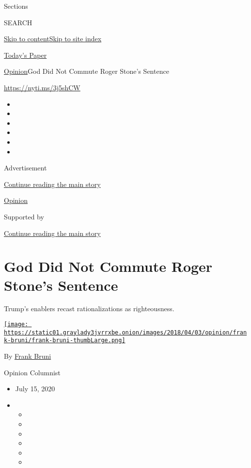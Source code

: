 Sections

SEARCH

\protect\hyperlink{site-content}{Skip to
content}\protect\hyperlink{site-index}{Skip to site index}

\href{https://myaccount.nytimes3xbfgragh.onion/auth/login?response_type=cookie\&client_id=vi}{}

\href{https://www.nytimes3xbfgragh.onion/section/todayspaper}{Today's
Paper}

\href{/section/opinion}{Opinion}\textbar{}God Did Not Commute Roger
Stone's Sentence

\url{https://nyti.ms/3j5shCW}

\begin{itemize}
\item
\item
\item
\item
\item
\item
\end{itemize}

Advertisement

\protect\hyperlink{after-top}{Continue reading the main story}

\href{/section/opinion}{Opinion}

Supported by

\protect\hyperlink{after-sponsor}{Continue reading the main story}

\hypertarget{god-did-not-commute-roger-stones-sentence}{%
\section{God Did Not Commute Roger Stone's
Sentence}\label{god-did-not-commute-roger-stones-sentence}}

Trump's enablers recast rationalizations as righteousness.

\href{https://www.nytimes3xbfgragh.onion/by/frank-bruni}{\texttt{[image: https://static01.graylady3jvrrxbe.onion/images/2018/04/03/opinion/frank-bruni/frank-bruni-thumbLarge.png]}}

By \href{https://www.nytimes3xbfgragh.onion/by/frank-bruni}{Frank Bruni}

Opinion Columnist

\begin{itemize}
\item
  July 15, 2020
\item
  \begin{itemize}
  \item
  \item
  \item
  \item
  \item
  \item
  \end{itemize}
\end{itemize}

